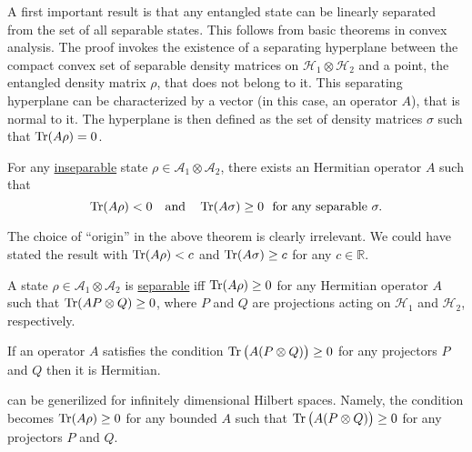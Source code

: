\documentclass[12pt]{report}
\begin{document}
A first important result is that any entangled state can be linearly separated from the set of all separable states.
This follows from basic theorems in convex analysis.
The proof invokes the existence of a separating hyperplane between the compact convex set of separable density matrices on $\mathcal H_1 \otimes \mathcal H_2$ and a point,
the entangled density matrix $\rho$,
that does not belong to it.
This separating hyperplane can be characterized by a vector (in this case, an operator $A$),
that is normal to it.
The hyperplane is then defined as the set of density matrices $\sigma$ such that
$\Tr(A\rho) = 0$.
\begin{thm}
	For any \uline{inseparable} state $\rho \in \mathcal A_1 \otimes \mathcal A_2$,
	there exists an Hermitian operator $A$ such that
	\begin{equation}
		\Tr(A\rho) < 0
		\quad \text{and} \quad
		\Tr(A\sigma) \ge 0
		\,\, \text{ for any separable }\sigma.
	\end{equation}
\end{thm}

\begin{remark}
	The choice of ``origin'' in the above theorem is clearly irrelevant.
	We could have stated the result with $\Tr(A\rho) < c$ and
	$\Tr(A\sigma) \ge c$ for any $c \in \mathbb R$.
\end{remark}

\begin{lemma}
	A state $\rho \in \mathcal A_1 \otimes \mathcal A_2$ is \uline{separable} iff
	$\Tr(A\rho) \ge 0$
	for any Hermitian operator $A$ such that
	$\Tr(A P\otimes Q) \ge 0$, where $P$ and $Q$ are projections acting on
	$\mathcal H_1$ and $\mathcal H_2$, respectively.
	\label{lemma:horodecki96_separable_iff_TrArhoPositive}
\end{lemma}

\begin{remark}
	If an operator $A$ satisfies the condition $\Tr\big( A(P \otimes Q) \big) \ge 0$
	for any projectors $P$ and $Q$ then it is Hermitian.
\end{remark}

\begin{remark}
	 can be generilized for infinitely dimensional Hilbert spaces.
	Namely, the condition becomes $\Tr(A\rho) \ge 0$ for any bounded $A$ such that
	$\Tr\big( A(P\otimes Q) \big) \ge 0$ for any projectors $P$ and $Q$.
\end{remark}
\end{document}
